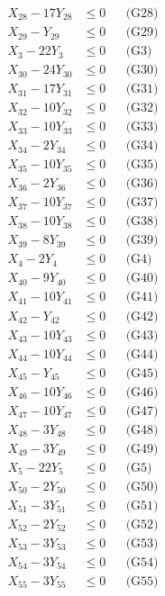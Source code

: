 \documentclass[a4paper,10pt]{article}
\begin{document}
{\begin{align}
X_{28} - 17Y_{28} &\leq 0 && \text{(G28)} \\
X_{29} - Y_{29} &\leq 0 && \text{(G29)} \\
X_{3} - 22Y_{3} &\leq 0 && \text{(G3)} \\
\allowbreak
X_{30} - 24Y_{30} &\leq 0 && \text{(G30)} \\
X_{31} - 17Y_{31} &\leq 0 && \text{(G31)} \\
X_{32} - 10Y_{32} &\leq 0 && \text{(G32)} \\
X_{33} - 10Y_{33} &\leq 0 && \text{(G33)} \\
X_{34} - 2Y_{34} &\leq 0 && \text{(G34)} \\
X_{35} - 10Y_{35} &\leq 0 && \text{(G35)} \\
X_{36} - 2Y_{36} &\leq 0 && \text{(G36)} \\
X_{37} - 10Y_{37} &\leq 0 && \text{(G37)} \\
X_{38} - 10Y_{38} &\leq 0 && \text{(G38)} \\
X_{39} - 8Y_{39} &\leq 0 && \text{(G39)} \\
X_{4} - 2Y_{4} &\leq 0 && \text{(G4)} \\
X_{40} - 9Y_{40} &\leq 0 && \text{(G40)} \\
X_{41} - 10Y_{41} &\leq 0 && \text{(G41)} \\
X_{42} - Y_{42} &\leq 0 && \text{(G42)} \\
X_{43} - 10Y_{43} &\leq 0 && \text{(G43)} \\
X_{44} - 10Y_{44} &\leq 0 && \text{(G44)} \\
X_{45} - Y_{45} &\leq 0 && \text{(G45)} \\
X_{46} - 10Y_{46} &\leq 0 && \text{(G46)} \\
X_{47} - 10Y_{47} &\leq 0 && \text{(G47)} \\
X_{48} - 3Y_{48} &\leq 0 && \text{(G48)} \\
\allowbreak
X_{49} - 3Y_{49} &\leq 0 && \text{(G49)} \\
X_{5} - 22Y_{5} &\leq 0 && \text{(G5)} \\
X_{50} - 2Y_{50} &\leq 0 && \text{(G50)} \\
X_{51} - 3Y_{51} &\leq 0 && \text{(G51)} \\
X_{52} - 2Y_{52} &\leq 0 && \text{(G52)} \\
X_{53} - 3Y_{53} &\leq 0 && \text{(G53)} \\
X_{54} - 3Y_{54} &\leq 0 && \text{(G54)} \\
X_{55} - 3Y_{55} &\leq 0 && \text{(G55)} \\

\end{align}}
\end{document}
